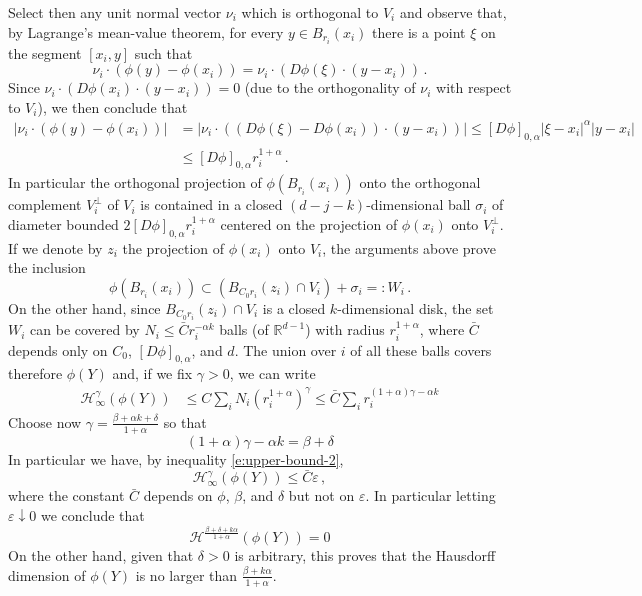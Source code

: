 \documentclass[11pt,reqno]{amsart}
\theoremstyle{definition}
\numberwithin{equation}{section}
\begin{document}
Select then any unit normal vector $\nu_i$ which is orthogonal to $V_i$ and observe that, by Lagrange's mean-value theorem, for every $y\in B_{r_i} (x_i)$ there is a point $\xi$ on the segment $[x_i, y]$ such that  
\[
\nu_i \cdot (\phi (y)-\phi (x_i)) = \nu_i \cdot (D\phi (\xi) \cdot (y-x_i))\, .
\]
Since $\nu_i \cdot (D\phi (x_i) \cdot (y-x_i)) = 0$ (due to the orthogonality of $\nu_i$ with respect to $V_i$), we then conclude that 
\begin{align*}
|\nu_i \cdot (\phi (y) - \phi (x_i))| &= 
|\nu_i \cdot ((D\phi (\xi)-D\phi (x_i))\cdot (y-x_i))|
\leq [D \phi]_{0, \alpha} |\xi - x_i|^\alpha |y-x_i|\\
& \leq [D \phi]_{0, \alpha} r_i^{1+\alpha}\, .
\end{align*}
In particular the orthogonal projection of $\phi (B_{r_i} (x_i))$ onto the orthogonal complement $V_i^\perp$ of $V_i$ is contained in a closed $(d-j-k)$-dimensional ball $\sigma_i$ of diameter bounded $2 [D \phi]_{0, \alpha} r_i^{1+\alpha}$ centered on the projection of $\phi (x_i)$ onto $V_i^\perp$. If we denote by $z_i$ the projection of $\phi (x_i)$ onto $V_i$, the arguments above prove the inclusion
\[
\phi (B_{r_i} (x_i)) \subset (B_{C_0 r_i} (z_i) \cap V_i) + \sigma_i =: W_i\, .
\]
On the other hand, since $B_{C_0 r_i} (z_i)\cap V_i$ is a closed $k$-dimensional disk, the set $W_i$ can be covered by $N_i \leq \bar C r_i^{-\alpha k}$ balls  (of $\mathbb R^{d-1}$) with radius $r_i^{1+\alpha}$, where $\bar C$ depends only on $C_0$, $[D \phi]_{0, \alpha}$, and $d$. The union over $i$ of all these balls covers therefore $\phi (Y)$ and, if we fix $\gamma>0$, we can write
\begin{align}
\mathcal{H}^\gamma_\infty (\phi (Y)) &\leq C \sum_i N_i (r_i^{1+\alpha})^\gamma \leq \bar C \sum_i r_i^{(1+\alpha)\gamma - \alpha k}\label{e:Hausdorff-bound}
\end{align}
Choose now $\gamma = \frac{\beta+\alpha k + \delta}{1+\alpha}$ so that 
\[
(1+\alpha) \gamma -\alpha k = \beta + \delta
\]
In particular we have, by inequality \eqref{e:upper-bound-2},
\[
\mathcal{H}^\gamma_\infty (\phi (Y)) \leq \bar C \varepsilon\, ,
\]
where the constant $\bar C$ depends on $\phi$, $\beta$, and $\delta$ but not on $\varepsilon$. In particular letting $\varepsilon \downarrow 0$ we conclude that 
\[
\mathcal{H}^{\frac{\beta+\delta+k\alpha}{1+\alpha}} (\phi (Y))=0
\]
On the other hand, given that $\delta>0$ is arbitrary, this proves that the Hausdorff dimension of $\phi (Y)$ is no larger than $\frac{\beta+k\alpha}{1+\alpha}$. 
\end{document}
